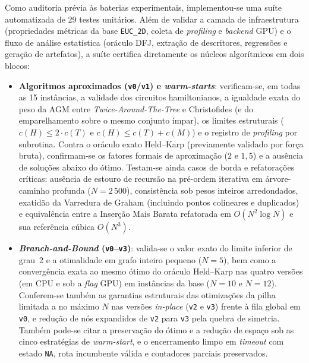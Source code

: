Como auditoria prévia às baterias experimentais, implementou-se uma suíte automatizada de 29
testes unitários. Além de validar a camada de infraestrutura (propriedades métricas da base
\texttt{EUC\_2D}, coleta de \textit{profiling} e \textit{backend} GPU) e o fluxo de análise
estatística (oráculo DFJ, extração de descritores, regressões e geração de artefatos), a suíte
certifica diretamente os núcleos algorítmicos em dois blocos:
\begin{itemize}
  \item \textbf{Algoritmos aproximados (\texttt{v0}/\texttt{v1}) e \textit{warm-starts}}:
  verificam-se, em todas as 15 instâncias, a validade dos circuitos hamiltonianos, a igualdade
  exata do peso da AGM entre \textit{Twice-Around-The-Tree} e Christofides (e do emparelhamento
  sobre o mesmo conjunto ímpar), os limites estruturais ($c(H) \le 2 \cdot c(T)$ e
  $c(H) \le c(T) + c(M)$) e o registro de \textit{profiling} por subrotina. Contra o oráculo
  exato Held--Karp (previamente validado por força bruta), confirmam-se os fatores formais de
  aproximação ($2$ e $1{,}5$) e a ausência de soluções abaixo do ótimo. Testam-se ainda casos de
  borda e refatorações críticas: ausência de estouro de recursão na pré-ordem iterativa em
  árvore-caminho profunda ($N = 2\,500$), consistência sob pesos inteiros arredondados,
  exatidão da Varredura de Graham (incluindo pontos colineares e duplicados) e equivalência
  entre a Inserção Mais Barata refatorada em $O(N^2 \log N)$ e sua referência cúbica $O(N^3)$.
  \item \textbf{\textit{Branch-and-Bound} (\texttt{v0}--\texttt{v3})}: valida-se o valor exato
  do limite inferior de grau~2 e a otimalidade em grafo inteiro pequeno ($N = 5$), bem como a
  convergência exata ao mesmo ótimo do oráculo Held--Karp nas quatro versões (em CPU e sob a
  \textit{flag} GPU) em instâncias da base ($N = 10$ e $N = 12$). Conferem-se também as
  garantias estruturais das otimizações da pilha limitada a no máximo $N$ nas versões
  \textit{in-place} (\texttt{v2} e \texttt{v3}) frente à fila global em \texttt{v0}, e redução
  de nós expandidos de \texttt{v2} para \texttt{v3} pela quebra de simetria. Também pode-se citar a preservação
  do ótimo e a redução de espaço sob as cinco estratégias de \textit{warm-start}, e o
  encerramento limpo em \textit{timeout} com estado \texttt{NA}, rota incumbente válida e
  contadores parciais preservados.
\end{itemize}

